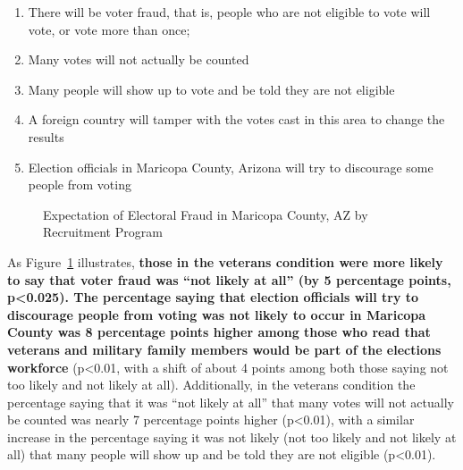 \documentclass[
  11pt,
  a4paper,
]{article}
\providecommand{\tightlist}{%
  \setlength{\itemsep}{0pt}\setlength{\parskip}{0pt}}\usepackage{longtable,booktabs,array}
\begin{document}
\begin{enumerate}
\def\labelenumi{\arabic{enumi}.}
\tightlist
\item
  There will be voter fraud, that is, people who are not eligible to
  vote will vote, or vote more than once;
\item
  Many votes will not actually be counted
\item
  Many people will show up to vote and be told they are not eligible
\item
  A foreign country will tamper with the votes cast in this area to
  change the results
\item
  Election officials in Maricopa County, Arizona will try to discourage
  some people from voting
\end{enumerate}

\begin{figure}

\caption{\label{fig-q28-likert}Expectation of Electoral Fraud in
Maricopa County, AZ by Recruitment Program}


\end{figure}%

As Figure~\ref{fig-q28-likert} illustrates, \textbf{those in the
veterans condition were more likely to say that voter fraud was ``not
likely at all'' (by 5 percentage points, p\textless0.025). The
percentage saying that election officials will try to discourage people
from voting was not likely to occur in Maricopa County was 8 percentage
points higher among those who read that veterans and military family
members would be part of the elections workforce} (p\textless0.01, with
a shift of about 4 points among both those saying not too likely and not
likely at all). Additionally, in the veterans condition the percentage
saying that it was ``not likely at all'' that many votes will not
actually be counted was nearly 7 percentage points higher
(p\textless0.01), with a similar increase in the percentage saying it
was not likely (not too likely and not likely at all) that many people
will show up and be told they are not eligible (p\textless0.01).
\end{document}
